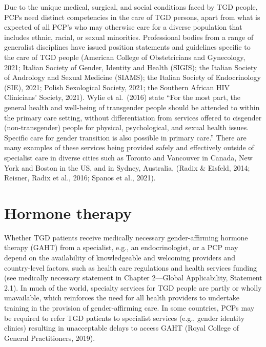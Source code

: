 \documentclass[
]{book}
\begin{document}
Due to the unique medical, surgical, and social
conditions faced by TGD people, PCPs need distinct competencies in the care of TGD persons,
apart from what is expected of all PCP's who
may otherwise care for a diverse population that
includes ethnic, racial, or sexual minorities.
Professional bodies from a range of generalist
disciplines have issued position statements and
guidelines specific to the care of TGD people
(American College of Obstetricians and
Gynecology, 2021; Italian Society of Gender,
Identity and Health (SIGIS); the Italian Society
of Andrology and Sexual Medicine (SIAMS); the
Italian Society of Endocrinology (SIE), 2021;
Polish Sexological Society, 2021; the Southern
African HIV Clinicians' Society, 2021). Wylie
et al.~(2016) state ``For the most part, the general
health and well-being of transgender people
should be attended to within the primary care
setting, without differentiation from services
offered to cisgender (non-transgender) people for
physical, psychological, and sexual health issues.
Specific care for gender transition is also possible
in primary care.'' There are many examples of
these services being provided safely and effectively outside of specialist care in diverse cities
such as Toronto and Vancouver in Canada, New
York and Boston in the US, and in Sydney,
Australia, (Radix \& Eisfeld, 2014; Reisner, Radix
et al., 2016; Spanos et al., 2021).

\hypertarget{hormone-therapy-1}{%
\section*{Hormone therapy}\label{hormone-therapy-1}}

Whether TGD patients receive medically necessary gender-affirming hormone therapy (GAHT)
from a specialist, e.g., an endocrinologist, or a
PCP may depend on the availability of knowledgeable and welcoming providers and
country-level factors, such as health care regulations and health services funding (see medically
necessary statement in Chapter 2---Global
Applicability, Statement 2.1). In much of the
world, specialty services for TGD people are
partly or wholly unavailable, which reinforces the
need for all health providers to undertake
training in the provision of gender-affirming care.
In some countries, PCPs may be required to refer
TGD patients to specialist services (e.g., gender
identity clinics) resulting in unacceptable delays
to access GAHT (Royal College of General
Practitioners, 2019).
\end{document}
